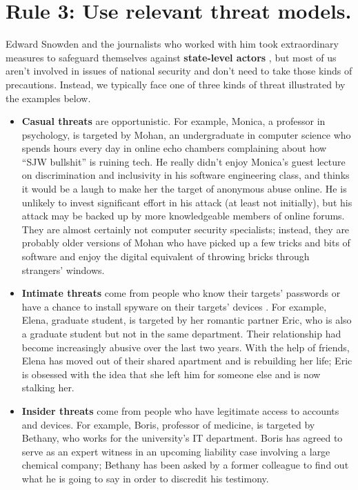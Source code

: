 \documentclass[10pt,letterpaper]{article}
\begin{document}
\section*{Rule 3: Use relevant threat models.}

Edward Snowden and the journalists who worked with him took extraordinary
measures to safeguard themselves against \textbf{state-level actors}
\cite{Snow2019}, but most of us aren't involved in issues of national
security and don't need to take those kinds of precautions. Instead, we
typically face one of three kinds of threat illustrated by the examples below.

\begin{itemize}
\item
  \textbf{Casual threats} are opportunistic. For example, Monica, a professor in
  psychology, is targeted by Mohan, an undergraduate in computer science who
  spends hours every day in online echo chambers complaining about how ``SJW
  bullshit'' is ruining tech. He really didn't enjoy Monica's guest lecture on
  discrimination and inclusivity in his software engineering class, and thinks
  it would be a laugh to make her the target of anonymous abuse online. He is
  unlikely to invest significant effort in his attack (at least not initially),
  but his attack may be backed up by more knowledgeable members of online
  forums. They are almost certainly not computer security specialists; instead,
  they are probably older versions of Mohan who have picked up a few tricks and
  bits of software and enjoy the digital equivalent of throwing bricks through
  strangers' windows.

\item
  \textbf{Intimate threats} come from people who know their targets' passwords
  or have a chance to install spyware on their targets' devices \cite{Leit2019}.
  For example, Elena, graduate student, is targeted by her romantic partner
  Eric, who is also a graduate student but not in the same department. Their
  relationship had become increasingly abusive over the last two years. With the
  help of friends, Elena has moved out of their shared apartment and is
  rebuilding her life; Eric is obsessed with the idea that she left him for
  someone else and is now stalking her.

\item
  \textbf{Insider threats} come from people who have legitimate access to
  accounts and devices. For example, Boris, professor of medicine, is targeted
  by Bethany, who works for the university's IT department.  Boris has agreed to
  serve as an expert witness in an upcoming liability case involving a large
  chemical company; Bethany has been asked by a former colleague to find out
  what he is going to say in order to discredit his testimony.
\end{itemize}
\end{document}
